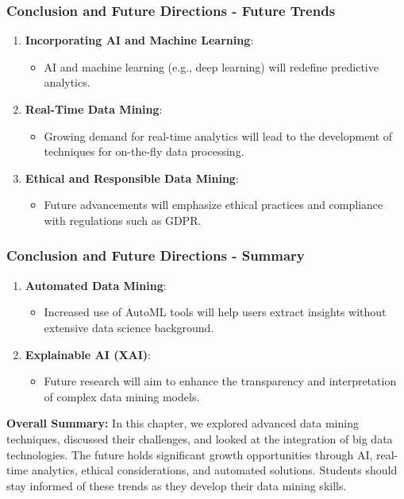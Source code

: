 \documentclass{beamer}
\begin{document}
\begin{frame}[fragile]
    \frametitle{Conclusion and Future Directions - Future Trends}
    \begin{enumerate}
        \item \textbf{Incorporating AI and Machine Learning}:
        \begin{itemize}
            \item AI and machine learning (e.g., deep learning) will redefine predictive analytics.
        \end{itemize}

        \item \textbf{Real-Time Data Mining}:
        \begin{itemize}
            \item Growing demand for real-time analytics will lead to the development of techniques for on-the-fly data processing.
        \end{itemize}

        \item \textbf{Ethical and Responsible Data Mining}:
        \begin{itemize}
            \item Future advancements will emphasize ethical practices and compliance with regulations such as GDPR.
        \end{itemize}
    \end{enumerate}
\end{frame}

\begin{frame}[fragile]
    \frametitle{Conclusion and Future Directions - Summary}
    \begin{enumerate}
        \item \textbf{Automated Data Mining}:
        \begin{itemize}
            \item Increased use of AutoML tools will help users extract insights without extensive data science background.
        \end{itemize}

        \item \textbf{Explainable AI (XAI)}:
        \begin{itemize}
            \item Future research will aim to enhance the transparency and interpretation of complex data mining models.
        \end{itemize}
    \end{enumerate}
    
    \textbf{Overall Summary:} In this chapter, we explored advanced data mining techniques, discussed their challenges, and looked at the integration of big data technologies. The future holds significant growth opportunities through AI, real-time analytics, ethical considerations, and automated solutions. Students should stay informed of these trends as they develop their data mining skills.
\end{frame}
\end{document}
